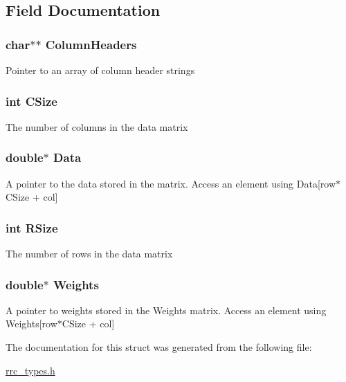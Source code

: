 \subsection{Field Documentation}
\hypertarget{struct_r_r_c_data_ab339159e5604808f92fe793f4f43da03}{
\subsubsection[{Column\+Headers}]{\setlength{\rightskip}{0pt plus 5cm}char$\ast$$\ast$ Column\+Headers}}\label{struct_r_r_c_data_ab339159e5604808f92fe793f4f43da03}
Pointer to an array of column header strings \hypertarget{struct_r_r_c_data_a17c9a5894aa9cb3789346dcaa9c370bb}{
\subsubsection[{C\+Size}]{\setlength{\rightskip}{0pt plus 5cm}int C\+Size}}\label{struct_r_r_c_data_a17c9a5894aa9cb3789346dcaa9c370bb}
The number of columns in the data matrix \hypertarget{struct_r_r_c_data_a7c5cbda3aa940f4b0d6e8a1679307dfc}{
\subsubsection[{Data}]{\setlength{\rightskip}{0pt plus 5cm}double$\ast$ Data}}\label{struct_r_r_c_data_a7c5cbda3aa940f4b0d6e8a1679307dfc}
A pointer to the data stored in the matrix. Access an element using Data\mbox{[}row$\ast$\+C\+Size + col\mbox{]} \hypertarget{struct_r_r_c_data_a4d8512c879223c0e0d1522dae38e7819}{
\subsubsection[{R\+Size}]{\setlength{\rightskip}{0pt plus 5cm}int R\+Size}}\label{struct_r_r_c_data_a4d8512c879223c0e0d1522dae38e7819}
The number of rows in the data matrix \hypertarget{struct_r_r_c_data_a557faafe2bb582e0c88078603aacb1c7}{
\subsubsection[{Weights}]{\setlength{\rightskip}{0pt plus 5cm}double$\ast$ Weights}}\label{struct_r_r_c_data_a557faafe2bb582e0c88078603aacb1c7}
A pointer to weights stored in the Weights matrix. Access an element using Weights\mbox{[}row$\ast$\+C\+Size + col\mbox{]} 

The documentation for this struct was generated from the following file\+:\begin{DoxyCompactItemize}
\item 
\hyperlink{rrc__types_8h}{rrc\+\_\+types.\+h}\end{DoxyCompactItemize}
